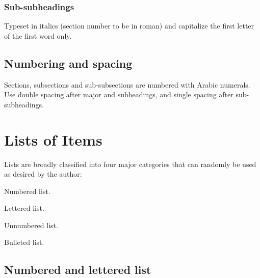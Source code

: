 \documentclass{ws-ijbc}
\begin{document}
\subsubsection{Sub-subheadings}
Typeset in italics (section number to be in roman) and capitalize
the first letter of the first word only.

\subsection{Numbering and spacing}
Sections, subsections and sub-subsections are numbered with Arabic
numerals. Use double spacing after major and subheadings, and
single spacing after sub-subheadings.

\section{Lists of Items}
Lists are broadly classified into four major categories that can
randomly be used as desired by the author:
\begin{alphlist}[(d)]
\item Numbered list.
\item Lettered list.
\item Unnumbered list.
\item Bulleted list.
\end{alphlist}

\subsection{Numbered and lettered list}
\end{document}
